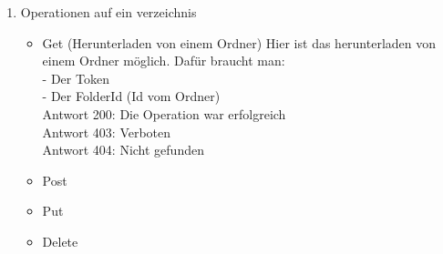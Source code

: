 \begin{enumerate}
\item Operationen auf ein verzeichnis
	\begin{itemize}
	\item Get (Herunterladen von einem Ordner)
Hier ist das herunterladen von einem Ordner m\"oglich. Daf\"ur braucht man: \\
	- Der Token \\
	- Der FolderId (Id vom  Ordner) \\
Antwort 200: Die Operation war erfolgreich \\ 
Antwort 403: Verboten \\
Antwort 404: Nicht gefunden
	\item Post
	\item Put
	\item Delete
	\end{itemize}
\end{enumerate}